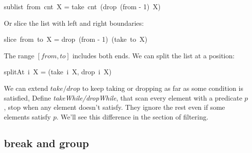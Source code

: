 \documentclass[b5paper]{article}
\begin{document}
\be
sublist\ from\ cnt\ X = take\ cnt\ (drop\ (from - 1)\ X)
\ee

Or slice the list with left and right boundaries:

\be
slice\ from\ to\ X = drop\ (from - 1)\ (take\ to\ X)
\ee

The range $[from, to]$ includes both ends. We can split the list at a position:

\be
splitAt\ i\ X = (take\ i\ X, drop\ i\ X)
\label{eq:split-at}
\ee

 
We can extend $take/drop$ to keep taking or dropping as far as some condition is satisfied, Define \textit{takeWhile/dropWhile}, that scan every element with a predicate $p$, stop when any element doesn't satisfy. They ignore the rest even if some elements satisfy $p$. We'll see this difference in the section of filtering.

\be
{}
\ee

\begin{Exercise}
\end{Exercise}

\subsection{break and group}
 
\end{document}
